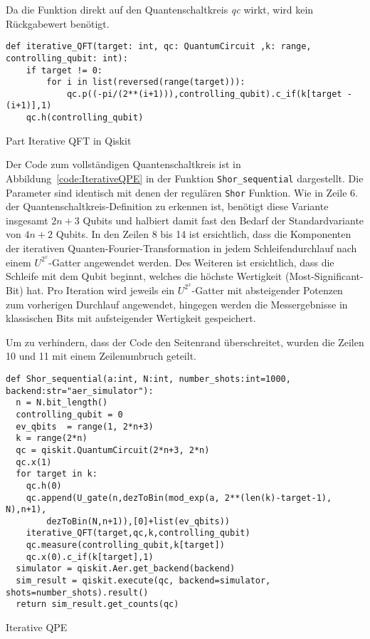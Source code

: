 Da die Funktion direkt auf den Quantenschaltkreis \textit{qc} wirkt, 
wird kein Rückgabewert benötigt.
\begin{listing}[H]
\begin{verbatim}    
def iterative_QFT(target: int, qc: QuantumCircuit ,k: range, controlling_qubit: int):
    if target != 0:
        for i in list(reversed(range(target))):
            qc.p((-pi/(2**(i+1))),controlling_qubit).c_if(k[target - (i+1)],1)
    qc.h(controlling_qubit)
  \end{verbatim}
  \caption{Part Iterative QFT in Qiskit}
  \label{code:iterativeQFT}
\end{listing}

Der Code zum vollständigen Quantenschaltkreis ist in Abbildung~\ref{code:IterativeQPE} in der Funktion \texttt{Shor\_sequential} dargestellt.
Die Parameter sind identisch mit denen der regulären \texttt{Shor} Funktion. 
Wie in Zeile 6. der Quantenschaltkreis-Definition zu erkennen ist, 
benötigt diese Variante insgesamt \(2n+3\) Qubits und halbiert damit fast den Bedarf der Standardvariante von \(4n+2\) Qubits.
In den Zeilen 8 bis 14 ist ersichtlich, 
dass die Komponenten der iterativen Quanten-Fourier-Transformation in jedem Schleifendurchlauf nach einem \(U^{2^x}\)-Gatter angewendet werden. 
Des Weiteren ist ersichtlich, 
dass die Schleife mit dem Qubit beginnt, 
welches die höchste Wertigkeit (Most-Significant-Bit) hat.
Pro Iteration wird jeweils ein \(U^{2^x}\)-Gatter mit absteigender Potenzen zum vorherigen Durchlauf angewendet, 
hingegen werden die Messergebnisse in klassischen Bits mit aufsteigender Wertigkeit gespeichert.

Um zu verhindern, 
dass der Code den Seitenrand überschreitet, wurden die Zeilen 10 und 11 mit einem Zeilenumbruch geteilt.

\begin{listing}[H]
\begin{verbatim}    
def Shor_sequential(a:int, N:int, number_shots:int=1000, backend:str="aer_simulator"):
  n = N.bit_length()
  controlling_qubit = 0
  ev_qbits  = range(1, 2*n+3)
  k = range(2*n)
  qc = qiskit.QuantumCircuit(2*n+3, 2*n) 
  qc.x(1)
  for target in k:
    qc.h(0)
    qc.append(U_gate(n,dezToBin(mod_exp(a, 2**(len(k)-target-1), N),n+1),
        dezToBin(N,n+1)),[0]+list(ev_qbits))
    iterative_QFT(target,qc,k,controlling_qubit)
    qc.measure(controlling_qubit,k[target])
    qc.x(0).c_if(k[target],1)
  simulator = qiskit.Aer.get_backend(backend)
  sim_result = qiskit.execute(qc, backend=simulator, shots=number_shots).result()
  return sim_result.get_counts(qc)
  \end{verbatim}
  \caption{Iterative QPE}
  \label{code:IterativeQPE}
\end{listing}

